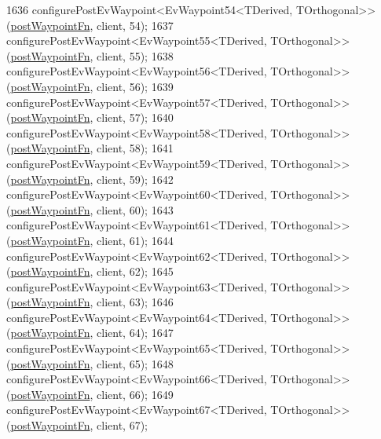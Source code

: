 \begin{DoxyCode}
1636     configurePostEvWaypoint<EvWaypoint54<TDerived, TOrthogonal>>(\hyperlink{classcl__move__base__z_1_1WaypointEventDispatcher_a964a57fcce5d48ec60243230722d8dd7}{postWaypointFn}, client, 54);
1637     configurePostEvWaypoint<EvWaypoint55<TDerived, TOrthogonal>>(\hyperlink{classcl__move__base__z_1_1WaypointEventDispatcher_a964a57fcce5d48ec60243230722d8dd7}{postWaypointFn}, client, 55);
1638     configurePostEvWaypoint<EvWaypoint56<TDerived, TOrthogonal>>(\hyperlink{classcl__move__base__z_1_1WaypointEventDispatcher_a964a57fcce5d48ec60243230722d8dd7}{postWaypointFn}, client, 56);
1639     configurePostEvWaypoint<EvWaypoint57<TDerived, TOrthogonal>>(\hyperlink{classcl__move__base__z_1_1WaypointEventDispatcher_a964a57fcce5d48ec60243230722d8dd7}{postWaypointFn}, client, 57);
1640     configurePostEvWaypoint<EvWaypoint58<TDerived, TOrthogonal>>(\hyperlink{classcl__move__base__z_1_1WaypointEventDispatcher_a964a57fcce5d48ec60243230722d8dd7}{postWaypointFn}, client, 58);
1641     configurePostEvWaypoint<EvWaypoint59<TDerived, TOrthogonal>>(\hyperlink{classcl__move__base__z_1_1WaypointEventDispatcher_a964a57fcce5d48ec60243230722d8dd7}{postWaypointFn}, client, 59);
1642     configurePostEvWaypoint<EvWaypoint60<TDerived, TOrthogonal>>(\hyperlink{classcl__move__base__z_1_1WaypointEventDispatcher_a964a57fcce5d48ec60243230722d8dd7}{postWaypointFn}, client, 60);
1643     configurePostEvWaypoint<EvWaypoint61<TDerived, TOrthogonal>>(\hyperlink{classcl__move__base__z_1_1WaypointEventDispatcher_a964a57fcce5d48ec60243230722d8dd7}{postWaypointFn}, client, 61);
1644     configurePostEvWaypoint<EvWaypoint62<TDerived, TOrthogonal>>(\hyperlink{classcl__move__base__z_1_1WaypointEventDispatcher_a964a57fcce5d48ec60243230722d8dd7}{postWaypointFn}, client, 62);
1645     configurePostEvWaypoint<EvWaypoint63<TDerived, TOrthogonal>>(\hyperlink{classcl__move__base__z_1_1WaypointEventDispatcher_a964a57fcce5d48ec60243230722d8dd7}{postWaypointFn}, client, 63);
1646     configurePostEvWaypoint<EvWaypoint64<TDerived, TOrthogonal>>(\hyperlink{classcl__move__base__z_1_1WaypointEventDispatcher_a964a57fcce5d48ec60243230722d8dd7}{postWaypointFn}, client, 64);
1647     configurePostEvWaypoint<EvWaypoint65<TDerived, TOrthogonal>>(\hyperlink{classcl__move__base__z_1_1WaypointEventDispatcher_a964a57fcce5d48ec60243230722d8dd7}{postWaypointFn}, client, 65);
1648     configurePostEvWaypoint<EvWaypoint66<TDerived, TOrthogonal>>(\hyperlink{classcl__move__base__z_1_1WaypointEventDispatcher_a964a57fcce5d48ec60243230722d8dd7}{postWaypointFn}, client, 66);
1649     configurePostEvWaypoint<EvWaypoint67<TDerived, TOrthogonal>>(\hyperlink{classcl__move__base__z_1_1WaypointEventDispatcher_a964a57fcce5d48ec60243230722d8dd7}{postWaypointFn}, client, 67);

\end{DoxyCode}
